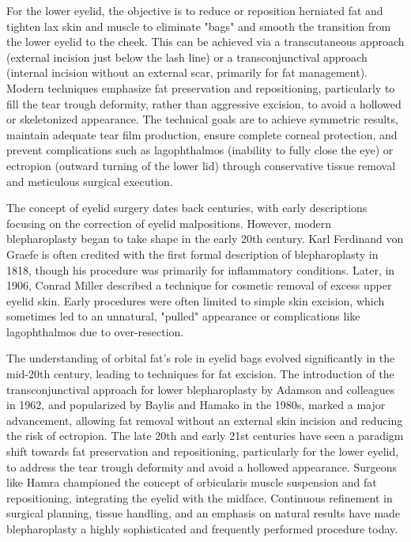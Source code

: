 For the lower eyelid, the objective is to reduce or reposition herniated fat and tighten lax skin and muscle to eliminate "bags" and smooth the transition from the lower eyelid to the cheek. This can be achieved via a transcutaneous approach (external incision just below the lash line) or a transconjunctival approach (internal incision without an external scar, primarily for fat management). Modern techniques emphasize fat preservation and repositioning, particularly to fill the tear trough deformity, rather than aggressive excision, to avoid a hollowed or skeletonized appearance. The technical goals are to achieve symmetric results, maintain adequate tear film production, ensure complete corneal protection, and prevent complications such as lagophthalmos (inability to fully close the eye) or ectropion (outward turning of the lower lid) through conservative tissue removal and meticulous surgical execution.

The concept of eyelid surgery dates back centuries, with early descriptions focusing on the correction of eyelid malpositions. However, modern blepharoplasty began to take shape in the early 20th century. Karl Ferdinand von Graefe is often credited with the first formal description of blepharoplasty in 1818, though his procedure was primarily for inflammatory conditions. Later, in 1906, Conrad Miller described a technique for cosmetic removal of excess upper eyelid skin. Early procedures were often limited to simple skin excision, which sometimes led to an unnatural, "pulled" appearance or complications like lagophthalmos due to over-resection.

The understanding of orbital fat's role in eyelid bags evolved significantly in the mid-20th century, leading to techniques for fat excision. The introduction of the transconjunctival approach for lower blepharoplasty by Adamson and colleagues in 1962, and popularized by Baylis and Hamako in the 1980s, marked a major advancement, allowing fat removal without an external skin incision and reducing the risk of ectropion. The late 20th and early 21st centuries have seen a paradigm shift towards fat preservation and repositioning, particularly for the lower eyelid, to address the tear trough deformity and avoid a hollowed appearance. Surgeons like Hamra championed the concept of orbicularis muscle suspension and fat repositioning, integrating the eyelid with the midface. Continuous refinement in surgical planning, tissue handling, and an emphasis on natural results have made blepharoplasty a highly sophisticated and frequently performed procedure today.

